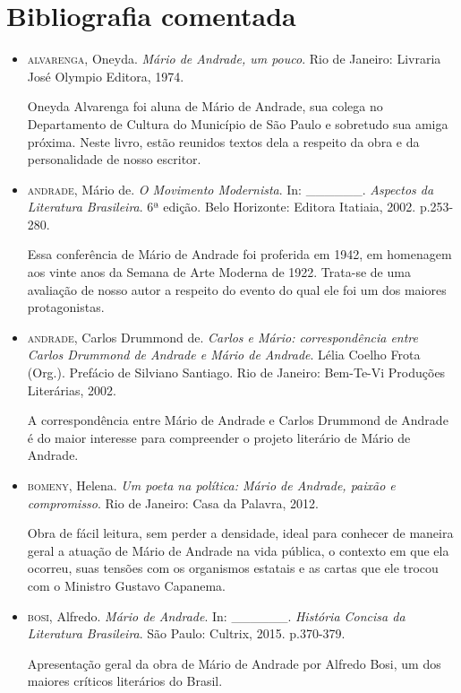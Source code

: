 \documentclass[11pt]{extarticle}
\begin{document}
\section{Bibliografia comentada}

\begin{itemize}
\item  \textsc{alvarenga}, Oneyda. \emph{Mário de Andrade, um pouco}. Rio de Janeiro:
Livraria José Olympio Editora, 1974.

Oneyda Alvarenga foi aluna de Mário de Andrade, sua colega no
Departamento de Cultura do Município de São Paulo e sobretudo sua amiga
próxima. Neste livro, estão reunidos textos dela a respeito da obra e da
personalidade de nosso escritor.

\item \textsc{andrade}, Mário de. \emph{O Movimento Modernista}. In: \_\_\_\_\_\_.
\emph{Aspectos da Literatura Brasileira}. 6ª edição. Belo Horizonte:
Editora Itatiaia, 2002. p.253-280.

Essa conferência de Mário de Andrade foi proferida em 1942, em homenagem
aos vinte anos da Semana de Arte Moderna de 1922. Trata-se de uma
avaliação de nosso autor a respeito do evento do qual ele foi um dos
maiores protagonistas.

\item \textsc{andrade}, Carlos Drummond de. \emph{Carlos e Mário: correspondência
entre Carlos Drummond de Andrade e Mário de Andrade}. Lélia Coelho Frota
(Org.). Prefácio de Silviano Santiago. Rio de Janeiro: Bem-Te-Vi
Produções Literárias, 2002.

A correspondência entre Mário de Andrade e Carlos Drummond de Andrade é
do maior interesse para compreender o projeto literário de Mário de
Andrade.

\item \textsc{bomeny}, Helena. \emph{Um poeta na política: Mário de Andrade, paixão e
compromisso}. Rio de Janeiro: Casa da Palavra, 2012.

Obra de fácil leitura, sem perder a densidade, ideal para conhecer de
maneira geral a atuação de Mário de Andrade na vida pública, o contexto
em que ela ocorreu, suas tensões com os organismos estatais e as cartas
que ele trocou com o Ministro Gustavo Capanema.

\item \textsc{bosi}, Alfredo. \emph{Mário de Andrade}. In: \_\_\_\_\_\_. \emph{História
Concisa da Literatura Brasileira}. São Paulo: Cultrix, 2015.
p.370-379.

Apresentação geral da obra de Mário de Andrade por Alfredo Bosi, um dos
maiores críticos literários do Brasil.


\end{itemize}
\end{document}
